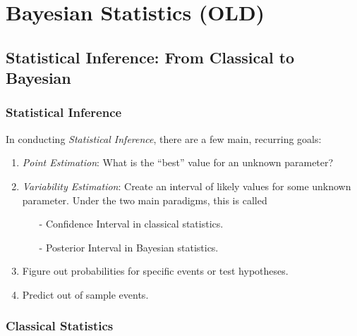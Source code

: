 \documentclass[12pt]{article}
\theoremstyle{plain}
\theoremstyle{definition}
\theoremstyle{remark}
\begin{document}
\clearpage
\section{Bayesian Statistics (OLD)}

\subsection{Statistical Inference: From Classical to Bayesian}

\subsubsection{Statistical Inference}
In conducting \emph{Statistical Inference}, there are a few
main, recurring goals:
\begin{enumerate}
   \item{\emph{Point Estimation}: What is the ``best'' value
      for an unknown parameter?}
   \item{\emph{Variability Estimation}: Create an interval of
      likely values for some unknown parameter. Under the two
      main paradigms, this is called
      \begin{itemize}
	 \item[-]{Confidence Interval in classical statistics.}
	 \item[-]{Posterior Interval in Bayesian statistics.}
      \end{itemize}
   }
   \item{Figure out probabilities for specific events or
      test hypotheses.}
   \item{Predict out of sample events.}
\end{enumerate}

\subsubsection{Classical Statistics}
\end{document}
